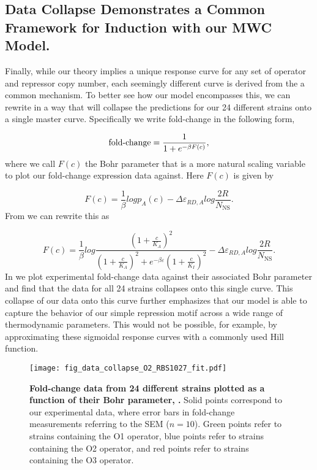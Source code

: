 \subsection*{Data Collapse Demonstrates a Common Framework for Induction with our MWC Model.}

Finally, while our theory implies a unique response curve for any set of operator and repressor copy number, each seemingly different curve is derived from the a common mechanism. To better see how our model encompasses this, we can rewrite \eref[eq7] in a way that will collapse the predictions for our 24 different strains onto a single master curve. Specifically we write fold-change in the following form,

\begin{equation}\label{eq8}
\operatorname{fold-change}= \frac{1}{1+e^{-\beta F(c)}} ,
\end{equation}
where we call $F(c)$ the Bohr parameter \cite{Phillips2016} that is a more natural scaling variable to plot our fold-change expression data against. Here $F(c)$ is given by

\begin{equation}\label{eq9}
F(c) =  \frac{1}{\beta} log p_A(c)
- \Delta\varepsilon_{RD,A}
log \frac{2R}{N_{\text{NS}}} .
\end{equation}
From \eref[eq7] we can rewrite this as

\begin{equation}\label{eq10}
F(c) = \frac{1}{\beta} log \frac{\left(1+\frac{c}{K_A}\right)^2}{\left(1+\frac{c}{K_A}\right)^2+e^{-\beta  \varepsilon }\left(1+\frac{c}{K_I}\right)^2} - \Delta\varepsilon_{RD,A} log \frac{2R}{N_{\text{NS}}} .
\end{equation}
In  we plot experimental fold-change data against their
associated Bohr parameter and find that the data for all 24 strains collapses onto this single curve. This collapse of our data onto this curve further emphasizes that our model is able to capture the behavior of our simple repression motif across a wide range of thermodynamic parameters. This would not be possible, for example, by approximating these sigmoidal response curves with a commonly used Hill function.

\begin{figure}[h]
	\centering \texttt{[image: fig\_data\_collapse\_O2\_RBS1027\_fit.pdf]}
	\caption{{\bf Fold-change data from 24 different strains plotted as a function of their Bohr parameter, \eref[eq10].} Solid points correspond to our	experimental data, where error bars in fold-change measurements referring to the SEM ($n=10$). Green points refer to strains containing the O1 operator, blue points refer to strains containing the O2 operator, and red points refer	to strains containing the O3 operator.
		} \label{fig_result3}
\end{figure}

